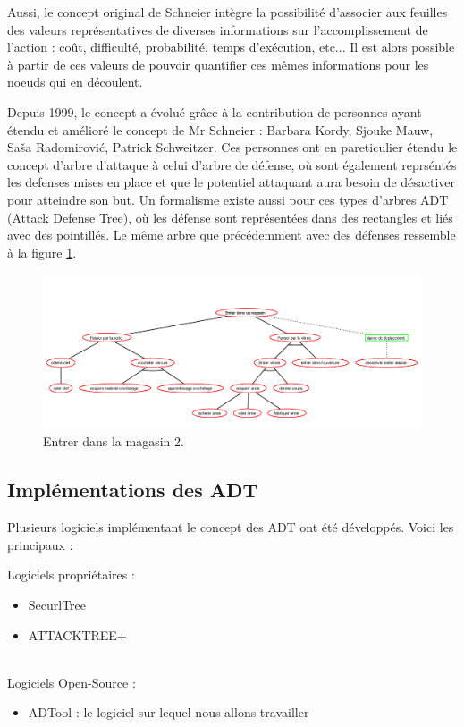         Aussi, le concept original de Schneier intègre la possibilité d'associer aux feuilles des valeurs représentatives de diverses informations sur l'accomplissement de l'action : coût, difficulté, probabilité, temps d'exécution, etc... Il est alors possible à partir de ces valeurs de pouvoir quantifier ces mêmes informations pour les noeuds qui en découlent.

        Depuis 1999, le concept a évolué grâce à la contribution de personnes ayant étendu et amélioré le concept de Mr Schneier : Barbara Kordy, Sjouke Mauw, Saša Radomirović, Patrick Schweitzer. Ces personnes ont en pareticulier étendu le concept d'arbre d'attaque à celui d'arbre de défense, où sont également reprséntés les defenses mises en place et que le potentiel attaquant aura besoin de désactiver pour atteindre son but. Un formalisme existe aussi pour ces types d'arbres ADT (Attack Defense Tree), où les défense sont représentées dans des rectangles et liés avec des pointillés. Le même arbre que précédemment avec des défenses ressemble à la figure \ref{fig:arbre_exemple_2}.

        \begin{figure}[h!]
            \begin{center}
                \includegraphics[width=1\textwidth]{figure/Entrer_dans_un_magasin2.png}
            \end{center}
            \caption{Entrer dans la magasin 2.}
            \label{fig:arbre_exemple_2}
        \end{figure}

    \subsection{Implémentations des ADT}
        Plusieurs logiciels implémentant le concept des ADT ont été développés. Voici les principaux :
        
        {\large Logiciels propriétaires :}
        \begin{itemize}
            \item SecurlTree
            \item ATTACKTREE+
        \end{itemize}
        ~~\\
        {\large Logiciels Open-Source :}
        \begin{itemize}
            \item ADTool : le logiciel sur lequel nous allons travailler
        \end{itemize}
~~

